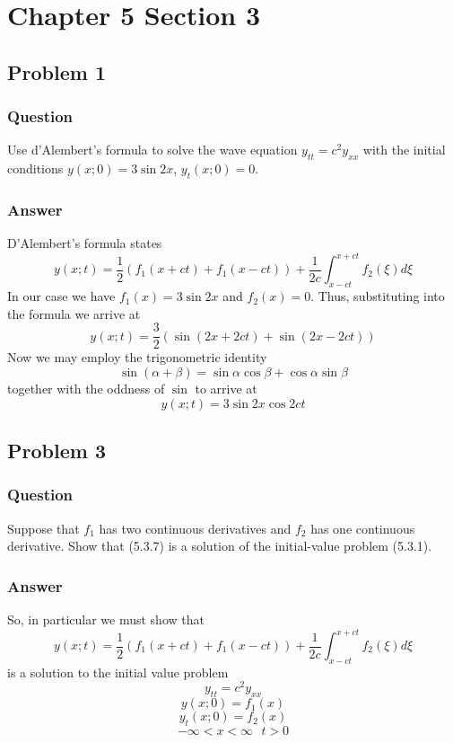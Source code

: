 \documentclass[12pt]{article}
\begin{document}
\section{Chapter 5 Section 3}

\subsection{Problem 1}
\subsubsection{Question}

Use d'Alembert's formula to solve the wave equation $y_{tt}=c^2y_{xx}$ with the initial conditions $y(x;0)=3\sin{2x}$, $y_t(x;0)=0$.

\subsubsection{Answer}

D'Alembert's formula \cite[Page 320]{pinsky} states
\[y(x; t)=\frac{1}{2}\left(f_1(x+ct)+f_1(x-ct) \right) + \frac{1}{2c} \int_{x-ct}^{x+ct}f_2(\xi) d\xi \]
In our case we have $f_1(x)=3 \sin{2x}$ and $f_2(x)=0$. Thus, substituting into the formula we arrive at 
\[y(x; t)=\frac{3}{2}\left( \sin{(2x+2ct)}+\sin{(2x-2ct)} \right)   \]
Now we may employ the trigonometric identity
\[\sin{(\alpha+\beta)}=\sin{\alpha}\cos{\beta}+\cos{\alpha}\sin{\beta}\]
together with the oddness of $\sin{}$ to arrive at
\[y(x; t)=3\sin{2x}\cos{2ct}\]

\subsection{Problem 3}
\subsubsection{Question}

Suppose that $f_1$ has two continuous derivatives and $f_2$ has one continuous derivative. Show that (5.3.7) is a solution of the initial-value  problem (5.3.1).

\subsubsection{Answer}


So, in particular we must show that 
\[y(x; t)=\frac{1}{2}\left(f_1(x+ct)+f_1(x-ct) \right) + \frac{1}{2c} \int_{x-ct}^{x+ct}f_2(\xi) d\xi \]
is a solution to the initial value problem 
\[y_{tt}=c^2y_{xx}\]
\[y(x;0)=f_1(x)\]
\[y_t(x;0)=f_2(x)\]
\[-\infty<x<\infty\ \ \ t>0\]
\end{document}
